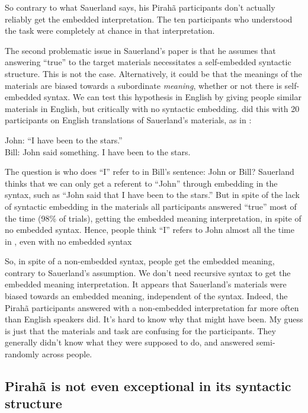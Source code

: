 \documentclass{article}
\begin{document}
So contrary to what Sauerland says, his Pirahã participants don’t actually reliably get the embedded interpretation. The ten participants who understood the task were completely at chance in that interpretation.

The second problematic issue in Sauerland's paper is that he assumes that answering ``true'' to the target materials necessitates a self-embedded syntactic structure.  This is not the case.  Alternatively, it could be that the meanings of the materials are biased towards a subordinate \textit{meaning}, whether or not there is self-embedded syntax.  We can test this hypothesis in English by giving people similar materials in English, but critically with no syntactic embedding.  \citet{everett2019recursion} did this with 20 participants on English translations of Sauerland's materials, as in : 

\ea
\label{ev_gib2019_ex}
John: “I have been to the stars.”\\
Bill: John said something. I have been to the stars.
\z

The question is who does ``I'' refer to in Bill’s sentence:  John or Bill? Sauerland thinks that we can only get a referent to ``John'' through embedding in the syntax, such as ``John said that I have been to the stars.''  But in spite of the lack of syntactic embedding in the materials all participants answered ``true'' most of the time (98\% of trials), getting the embedded meaning interpretation, in spite of no embedded syntax.  Hence, people think ``I'' refers to John almost all the time in , even with no embedded syntax

So, in spite of a non-embedded syntax, people get the embedded meaning, contrary to Sauerland’s assumption.  We don’t need recursive syntax to get the embedded meaning interpretation.  It appears that Sauerland's materials were biased towards an embedded meaning, independent of the syntax. Indeed, the Pirahã participants answered with a non-embedded interpretation far more often than English speakers did. It's hard to know why that might have been.  My guess is just that the materials and task are confusing for the participants.  They generally didn't know what they were supposed to do, and answered semi-randomly across people.

\subsection{Pirahã is not even exceptional in its syntactic structure}
\end{document}
